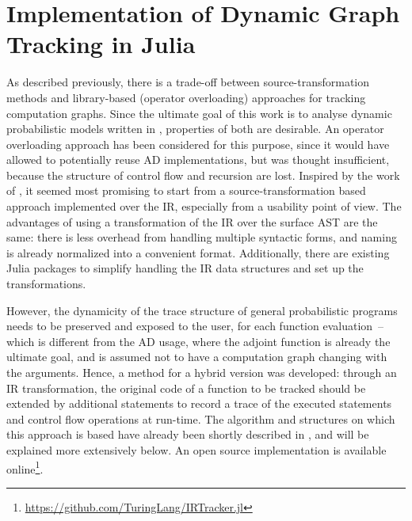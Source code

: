 \chapter{Implementation of Dynamic Graph Tracking in Julia}
\label{cha:impl-dynam-graph}

As described previously, there is a trade-off between source-transformation methods and
library-based (operator overloading) approaches for tracking computation graphs.  Since the ultimate
goal of this work is to analyse dynamic probabilistic models written in \turingjl{}, properties of
both are desirable.  An operator overloading approach has been considered for this purpose, since
it would have allowed to potentially reuse AD implementations, but was thought insufficient, because
the structure of control flow and recursion are lost.  Inspired by the work of
\textcite{innes2018don}, it seemed most promising to start from a source-transformation based
approach implemented over the IR, especially from a usability point of view.  The advantages of
using a transformation of the IR over the surface AST are the same: there is less overhead from
handling multiple syntactic forms, and naming is already normalized into a convenient format.
Additionally, there are existing Julia packages to simplify handling the IR data structures and set
up the transformations.

However, the dynamicity of the trace structure of general probabilistic programs needs to be
preserved and exposed to the user, for each function evaluation~-- which is different from the AD
usage, where the adjoint function is already the ultimate goal, and is assumed not to have a
computation graph changing with the arguments.  Hence, a method for a hybrid version was developed:
through an IR transformation, the original code of a function to be tracked should be extended by
additional statements to record a trace of the executed statements and control flow operations at
run-time.  The algorithm and structures on which this approach is based have already been shortly
described in \textcite{gabler2019graph}, and will be explained more extensively below.  An open
source implementation is available
online\footnote{\protect\url{https://github.com/TuringLang/IRTracker.jl}}.

